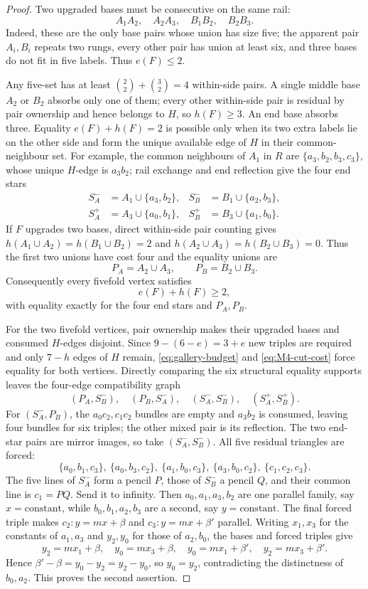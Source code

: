 \begin{proof}
Two upgraded bases must be consecutive on the same rail:
\[
 A_1A_2,\quad A_2A_3,\quad B_1B_2,\quad B_2B_3.
\]
Indeed, these are the only base pairs whose union has size five; the
apparent pair $A_i,B_i$ repeats two rungs, every other pair has union at
least six, and three bases do not fit in five labels.  Thus $e(F)\le2$.

Any five-set has at least
$\binom22+\binom32=4$ within-side pairs.  A single middle base $A_2$ or
$B_2$ absorbs only one of them; every other within-side pair is residual by
pair ownership and hence belongs to $H$, so $h(F)\ge3$.  An end base absorbs
three.  Equality $e(F)+h(F)=2$ is possible only when its two extra labels
lie on the other side and form the unique available edge of $H$ in their
common-neighbour set.  For example, the common neighbours of $A_1$ in $R$
are $\{a_3,b_2,b_3,c_3\}$, whose unique $H$-edge is $a_3b_2$; rail exchange
and end reflection give the four end stars
\[
\begin{aligned}
 S_A^-&=A_1\cup\{a_3,b_2\},&
 S_B^-&=B_1\cup\{a_2,b_3\},\\
 S_A^+&=A_3\cup\{a_0,b_1\},&
 S_B^+&=B_3\cup\{a_1,b_0\}.
\end{aligned}
\]
If $F$ upgrades two bases, direct within-side pair counting gives
$h(A_1\cup A_2)=h(B_1\cup B_2)=2$ and
$h(A_2\cup A_3)=h(B_2\cup B_3)=0$.  Thus the first two unions have cost
four and the equality unions are
\[
 P_A=A_2\cup A_3,\qquad P_B=B_2\cup B_3.
\]
Consequently every fivefold vertex satisfies
\begin{equation}\label{eq:M4-cut-cost}
 e(F)+h(F)\ge2,
\end{equation}
with equality exactly for the four end stars and $P_A,P_B$.

For the two fivefold vertices, pair ownership makes their upgraded bases
and consumed $H$-edges disjoint.  Since $9-(6-e)=3+e$ new triples are
required and only $7-h$ edges of $H$ remain, \eqref{eq:gallery-budget} and
\eqref{eq:M4-cut-cost} force equality for both vertices.  Directly comparing
the six structural equality supports leaves the four-edge compatibility
graph
\[
 (P_A,S_B^-),\quad(P_B,S_A^-),\quad
 (S_A^-,S_B^-),\quad(S_A^+,S_B^+).
\]
For $(S_A^-,P_B)$, the $a_0c_2,c_1c_2$ bundles are empty and
$a_3b_2$ is consumed, leaving four bundles for six triples; the other mixed
pair is its reflection.  The two end-star pairs are mirror images, so take
$(S_A^-,S_B^-)$.  All five residual triangles are forced:
\[
 \{a_0,b_1,c_3\},\ \{a_0,b_3,c_2\},\
 \{a_1,b_0,c_3\},\ \{a_3,b_0,c_2\},\ \{c_1,c_2,c_3\}.
\]
The five lines of $S_A^-$ form a pencil $P$, those of $S_B^-$ a pencil
$Q$, and their common line is $c_1=PQ$.  Send it to infinity.  Then
$a_0,a_1,a_3,b_2$ are one parallel family, say $x=\text{constant}$, while
$b_0,b_1,a_2,b_3$ are a second, say $y=\text{constant}$.  The final forced
triple makes
$c_2:y=mx+\beta$ and $c_3:y=mx+\beta'$ parallel.  Writing $x_1,x_3$ for
the constants of $a_1,a_3$ and $y_2,y_0$ for those of $a_2,b_0$, the bases
and forced triples give
\[
 y_2=mx_1+\beta,\quad y_0=mx_3+\beta,\quad
 y_0=mx_1+\beta',\quad y_2=mx_3+\beta'.
\]
Hence $\beta'-\beta=y_0-y_2=y_2-y_0$, so $y_0=y_2$, contradicting the
distinctness of $b_0,a_2$.  This proves the second assertion.
\end{proof}

